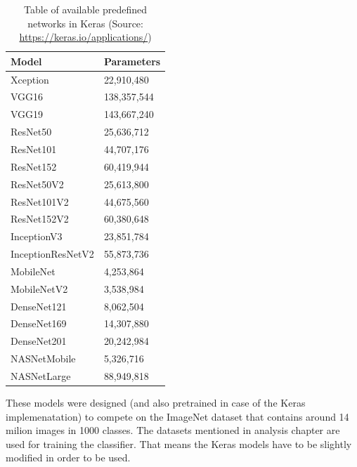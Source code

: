 \documentclass[thesis=M,english]{FITthesis}[2019/03/06]
\begin{document}
\begin{table}[ht!]

\centering
\caption[Table of available predefined networks in Keras]{Table of available predefined networks in Keras 
    (\small Source: \url{https://keras.io/applications/})}
    
\begin{tabular}{|l|l|}

\hline
\textbf{Model}             & \textbf{Parameters}  \\ \hline
Xception          & 22,910,480  \\ \hline
VGG16             & 138,357,544 \\ \hline
VGG19             & 143,667,240 \\ \hline
ResNet50          & 25,636,712  \\ \hline
ResNet101         & 44,707,176  \\ \hline
ResNet152         & 60,419,944  \\ \hline
ResNet50V2        & 25,613,800  \\ \hline
ResNet101V2       & 44,675,560  \\ \hline
ResNet152V2       & 60,380,648  \\ \hline
InceptionV3       & 23,851,784  \\ \hline
InceptionResNetV2 & 55,873,736  \\ \hline
MobileNet         & 4,253,864   \\ \hline
MobileNetV2       & 3,538,984   \\ \hline
DenseNet121       & 8,062,504   \\ \hline
DenseNet169       & 14,307,880  \\ \hline
DenseNet201       & 20,242,984  \\ \hline
NASNetMobile      & 5,326,716   \\ \hline
NASNetLarge       & 88,949,818  \\ \hline
\end{tabular}
\label{table:keras_models}
\end{table}

These models were designed (and also pretrained in case of the Keras implemenatation) to compete on the ImageNet dataset that contains around 14 milion images in 1000 classes. The datasets mentioned in analysis chapter are used for training the classifier. That means the Keras models have to be slightly modified in order to be used. \\
\end{document}
